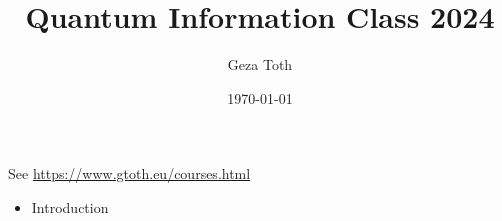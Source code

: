 \documentclass[11pt, oneside]{article}   	%
\title{Quantum Information Class 2024}
\author{Geza Toth}
\date{\today}							%
\begin{document}
\maketitle

\begin{center}
See  \href{https://www.gtoth.eu/courses.html}{https://www.gtoth.eu/courses.html}
\end{center}

\begin{itemize}

\item Introduction


\end{itemize}
\end{document}
